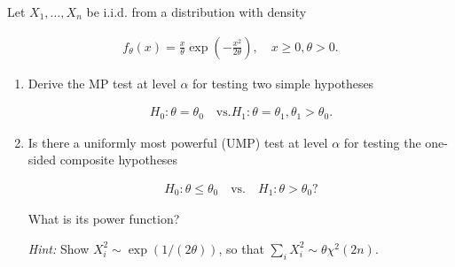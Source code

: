 
\begin{exercise}

Let $X_1,\dots,X_n$ be i.i.d. from a distribution with density

\begin{align*}
  f_\theta(x) = \frac{x}{\theta}\exp\left(-\frac{x^2}{2\theta}\right), \quad x \geq 0, \theta > 0.
\end{align*}

\begin{enumerate}[label = (\alph*)]
  \item Derive the MP test at level $\alpha$ for testing two simple hypotheses
  
  \begin{align*}
    H_0: \theta = \theta_0 \quad \text{vs.} H_1: \theta = \theta_1, \theta_1 > \theta_0.
  \end{align*}

  \item Is there a uniformly most powerful (UMP) test at level $\alpha$ for testing the
  one-sided composite hypotheses

  \begin{align*}
    H_0: \theta \leq \theta_0 \quad \text{vs.} \quad H_1: \theta > \theta_0?
  \end{align*}

  What is its power function?

  \textit{Hint:} Show $X_i^2 \sim \exp(1/(2\theta))$, so that $\sum_i X_i^2 \sim \theta \chi^2(2n)$.
\end{enumerate}

\end{exercise}


